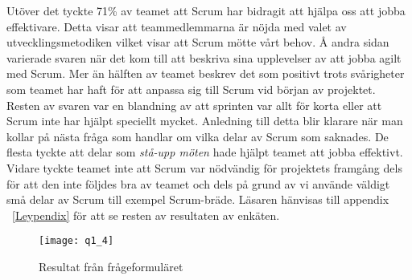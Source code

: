 Utöver det tyckte 71\% av teamet att Scrum har bidragit att hjälpa oss att jobba effektivare. Detta visar att teammedlemmarna är nöjda med valet av utvecklingsmetodiken vilket visar att Scrum mötte vårt behov. Å andra sidan varierade svaren när det kom till att beskriva sina upplevelser av att jobba agilt med Scrum. Mer än hälften av teamet beskrev det som positivt trots svårigheter som teamet har haft för att anpassa sig till Scrum vid början av projektet. Resten av svaren var en blandning av att sprinten var allt för korta eller att Scrum inte har hjälpt speciellt mycket. Anledning till detta blir klarare när man kollar på nästa fråga som handlar om vilka delar av Scrum som saknades. De flesta tyckte att delar som \textit{stå-upp möten} hade  hjälpt teamet att jobba effektivt. Vidare tyckte teamet inte att Scrum var nödvändig för projektets framgång dels för att den inte följdes bra av teamet och dels på grund av vi använde väldigt små delar av Scrum till exempel Scrum-bräde.
Läsaren hänvisas till appendix ~\ref{Leypendix} för att se resten av resultaten av enkäten.
\begin{figure*}[h]
	\centering
	\texttt{[image: q1\_4]}
	\caption{Resultat från frågeformuläret}\label{fig1}
	\label{q1}
\end{figure*}
\newpage